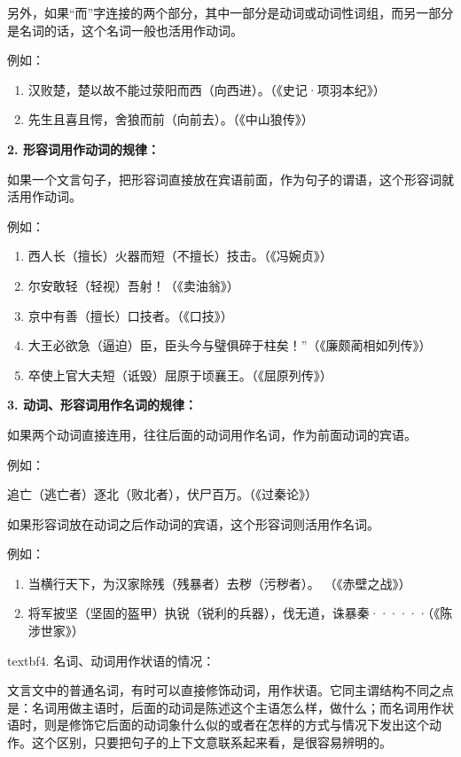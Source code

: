 另外，如果“而”字连接的两个部分，其中一部分是动词或动词性词组，而另一部分是名词的话，这个名词一般也活用作动词。

例如：

\begin{enumerate}[label=\textcircled{\arabic*}]
	\item 汉败楚，楚以故不能过荥阳而西（向西进）。（《史记·项羽本纪》）
	\item 先生且喜且愕，舍狼而前（向前去）。（《中山狼传》）
\end{enumerate}

\textbf{2. 形容词用作动词的规律：}

如果一个文言句子，把形容词直接放在宾语前面，作为句子的谓语，这个形容词就活用作动词。

例如：

\begin{enumerate}[label=\textcircled{\arabic*}]
	\item 西人长（擅长）火器而短（不擅长）技击。（《冯婉贞》）
	\item 尔安敢轻（轻视）吾射！（《卖油翁》）
	\item 京中有善（擅长）口技者。（《口技》）
	\item 大王必欲急（逼迫）臣，臣头今与璧俱碎于柱矣！”（《廉颇蔺相如列传》）
	\item 卒使上官大夫短（诋毁）屈原于顷襄王。（《屈原列传》）
\end{enumerate}

\textbf{3. 动词、形容词用作名词的规律：}

如果两个动词直接连用，往往后面的动词用作名词，作为前面动词的宾语。

例如：

追亡（逃亡者）逐北（败北者），伏尸百万。（《过秦论》）

如果形容词放在动词之后作动词的宾语，这个形容词则活用作名词。

例如：

\begin{enumerate}[label=\textcircled{\arabic*}]
	\item 当横行天下，为汉家除残（残暴者）去秽（污秽者）。 （《赤壁之战》）
	\item 将军披坚（坚固的盔甲）执锐（锐利的兵器），伐无道，诛暴秦······（《陈涉世家》）
\end{enumerate}

textbf{4. 名词、动词用作状语的情况：}

文言文中的普通名词，有时可以直接修饰动词，用作状语。它同主谓结构不同之点是：名词用做主语时，后面的动词是陈述这个主语怎么样，做什么；而名词用作状语时，则是修饰它后面的动词象什么似的或者在怎样的方式与情况下发出这个动作。这个区别，只要把句子的上下文意联系起来看，是很容易辨明的。

